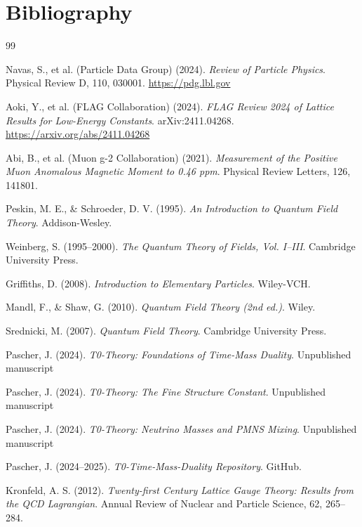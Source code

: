 	\section{Bibliography}
	
	\begin{thebibliography}{99}
		
		Navas, S., et al. (Particle Data Group) (2024).
		\textit{Review of Particle Physics}.
		Physical Review D, 110, 030001.
		\url{https://pdg.lbl.gov}
		
		Aoki, Y., et al. (FLAG Collaboration) (2024). 
		\textit{FLAG Review 2024 of Lattice Results for Low-Energy Constants}. 
		arXiv:2411.04268.
		\url{https://arxiv.org/abs/2411.04268}
		
		Abi, B., et al. (Muon g-2 Collaboration) (2021). 
		\textit{Measurement of the Positive Muon Anomalous Magnetic Moment to 0.46 ppm}. 
		Physical Review Letters, 126, 141801.
		
		Peskin, M. E., \& Schroeder, D. V. (1995). 
		\textit{An Introduction to Quantum Field Theory}. 
		Addison-Wesley.
		
		Weinberg, S. (1995--2000). 
		\textit{The Quantum Theory of Fields, Vol. I--III}. 
		Cambridge University Press.
		
		Griffiths, D. (2008). 
		\textit{Introduction to Elementary Particles}. 
		Wiley-VCH.
		
		Mandl, F., \& Shaw, G. (2010). 
		\textit{Quantum Field Theory (2nd ed.)}. 
		Wiley.
		
		Srednicki, M. (2007). 
		\textit{Quantum Field Theory}. 
		Cambridge University Press.
		
		Pascher, J. (2024). 
		\textit{T0-Theory: Foundations of Time-Mass Duality}. 
		Unpublished manuscript
		
		Pascher, J. (2024). 
		\textit{T0-Theory: The Fine Structure Constant}. 
		Unpublished manuscript
		
		Pascher, J. (2024). 
		\textit{T0-Theory: Neutrino Masses and PMNS Mixing}. 
		Unpublished manuscript
		
		Pascher, J. (2024--2025). 
		\textit{T0-Time-Mass-Duality Repository}. 
		GitHub.

		Kronfeld, A. S. (2012). 
		\textit{Twenty-first Century Lattice Gauge Theory: Results from the QCD Lagrangian}. 
		Annual Review of Nuclear and Particle Science, 62, 265--284.
		

\end{thebibliography}
